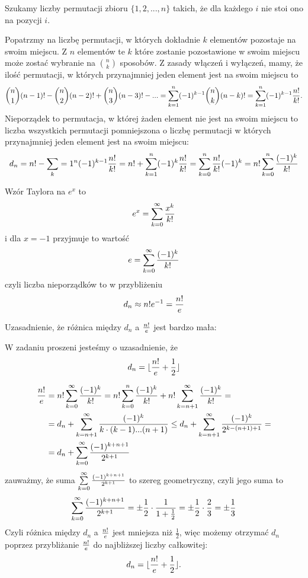 \documentclass{article}[13pt]
\begin{document}
Szukamy liczby permutacji zbioru $\{1,2,...,n\}$ takich, że dla każdego $i$ nie stoi ono na pozycji $i$.
\medskip

Popatrzmy na liczbę permutacji, w których dokładnie $k$ elementów pozostaje na swoim miejscu. Z $n$ elementów te $k$ które zostanie pozostawione w swoim miejscu może zostać wybranie na ${n\choose k}$ sposobów. Z zasady włączeń i wyłączeń, mamy, że ilość permutacji, w których przynajmniej jeden element jest na swoim miejscu to
\begin{align*}
    {n\choose 1}(n-1)!-{n\choose 2}(n-2)!+{n\choose 3}(n-3)!-...=\sum\limits_{k=1}^n(-1)^{k-1}{n\choose k}(n-k)!=\sum\limits_{k=1}^n(-1)^{k-1}{n!\over k!}.
\end{align*}
Nieporządek to permutacja, w której żaden element nie jest na swoim miejscu to liczba wszystkich permutacji pomniejszona o liczbę permutacji w których przynajmniej jeden element jest na swoim miejscu:
\begin{align*}
    d_n=n!-\sum\limits_k=1^n(-1)^{k-1}{n!\over k!}=n!+\sum\limits_{k=1}^n(-1)^k{n!\over k!}=\sum\limits_{k=0}^n{n!\over k!}(-1)^k=n!\sum\limits_{k=0}^n{(-1)^k\over k!}
\end{align*}

Wzór Taylora na $e^x$ to
$$e^x=\sum\limits_{k=0}^\infty{x^k\over k!}$$
i dla $x=-1$ przyjmuje to wartość
$$e=\sum\limits_{k=0}^\infty{(-1)^k\over k!}$$
czyli liczba nieporządków to w przybliżeniu
$$d_n\approx n!e^{-1}={n!\over e}$$

{\color{def}Uzasadnienie, że różnica między $d_n$ a ${n!\over e}$ jest bardzo mała:}\smallskip

W zadaniu proszeni jesteśmy o uzasadnienie, że 
$$d_n=\lfloor{n!\over e}+\frac12\rfloor$$

\begin{align*}
    {n!\over e}&=n!\sum\limits_{k=0}^\infty {(-1)^k\over k!}=n!\sum\limits_{k=0}^{n}{(-1)^k\over k!}+n!\sum\limits_{k=n+1}^\infty {(-1)^k\over k!}=\\
    &=d_n+\sum\limits_{k=n+1}^\infty{(-1)^k\over k\cdot (k-1)...(n+1)}\leq d_n+\sum\limits_{k=n+1}^\infty {(-1)^k\over 2^{k-(n+1)+1}}=\\
    &=d_n+\sum\limits_{k=0}^\infty {(-1)^{k+n+1}\over 2^{k+1}}
\end{align*}
zauważmy, że suma $\sum\limits_{k=0}^\infty {(-1)^{k+n+1}\over 2^{k+1}}$ to szereg geometryczny, czyli jego suma to
$$\sum\limits_{k=0}^\infty {(-1)^{k+n+1}\over 2^{k+1}}=\pm\frac 12\cdot{1\over 1+\frac12}=\pm\frac12\cdot{2\over 3}=\pm\frac13$$
Czyli różnica między $d_n$ a ${n!\over e}$ jest mniejsza niż $\frac12$, więc możemy otrzymać $d_n$ poprzez przybliżanie ${n!\over e}$ do najbliższej liczby całkowitej:
$$d_n=\lfloor{n!\over e}+\frac12\rfloor.$$
\end{document}
